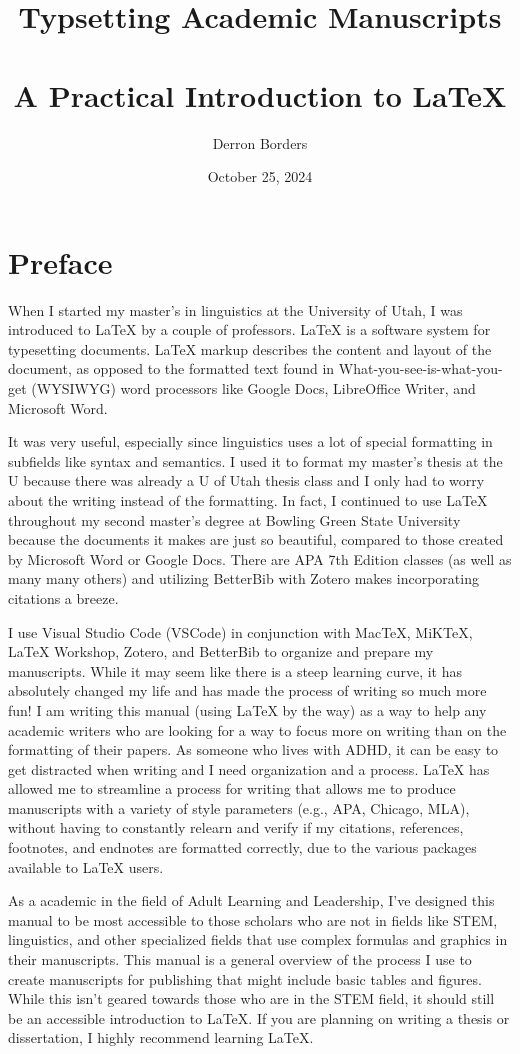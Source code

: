 \documentclass[12pt, oneside]{article}
\title{\textbf{Typsetting Academic Manuscripts} \\
~\\
A Practical Introduction to \LaTeX{}}
\author{Derron Borders}
\date{October 25, 2024}
\begin{document}
\maketitle
\newpage
\tableofcontents
\newpage


\section*{Preface}
When I started my master's in linguistics at the University of Utah, I was introduced to \LaTeX{} by a couple of professors. \LaTeX{} is a software system for typesetting documents. \LaTeX{} markup describes the content and layout of the document, as opposed to the formatted text found in What-you-see-is-what-you-get (WYSIWYG) word processors like Google Docs, LibreOffice Writer, and Microsoft Word. 

It was very useful, especially since linguistics uses a lot of special formatting in subfields like syntax and semantics. I used it to format my master's thesis at the U because there was already a U of Utah thesis class and I only had to worry about the writing instead of the formatting. In fact, I continued to use \LaTeX{} throughout my second master's degree at Bowling Green State University because the documents it makes are just so beautiful, compared to those created by Microsoft Word or Google Docs. There are APA 7th Edition classes (as well as many many others) and utilizing BetterBib with Zotero makes incorporating citations a breeze.

I use Visual Studio Code (VSCode) in conjunction with MacTeX, MiKTeX, \LaTeX{} Workshop, Zotero, and BetterBib to organize and prepare my manuscripts. While it may seem like there is a steep learning curve, it has absolutely changed my life and has made the process of writing so much more fun! I am writing this manual (using \LaTeX{} by the way) as a way to help any academic writers who are looking for a way to focus more on writing than on the formatting of their papers. As someone who lives with ADHD, it can be easy to get distracted when writing and I need organization and a process. \LaTeX{} has allowed me to streamline a process for writing that allows me to produce manuscripts with a variety of style parameters (e.g., APA, Chicago, MLA), without having to constantly relearn and verify if my citations, references, footnotes, and endnotes are formatted correctly, due to the various packages available to \LaTeX{} users. 

As a academic in the field of Adult Learning and Leadership, I've designed this manual to be most accessible to those scholars who are not in fields like STEM, linguistics, and other specialized fields that use complex formulas and graphics in their manuscripts. This manual is a general overview of the process I use to create manuscripts for publishing that might include basic tables and figures. While this isn't geared towards those who are in the STEM field, it should still be an accessible introduction to \LaTeX{}. If you are planning on writing a thesis or dissertation, I highly recommend learning \LaTeX{}. 
\end{document}
